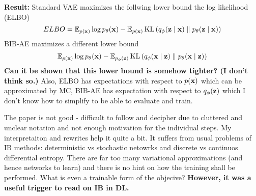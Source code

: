 \begin{notebox}
\textbf{Result: }
Standard VAE maximizes the follwing lower bound the log likelihood (ELBO)
\begin{equation}
ELBO = \mathbb{E}_{p(\mathbf{x})} \log p_\theta(\mathbf{x}) - \mathbb{E}_{p(\mathbf{x})} \operatorname*{KL} \left( q_\phi( \mathbf{z} \mid \mathbf{x}) \parallel p_\theta(\mathbf{z} \mid \mathbf{x}) \right)
\end{equation}
BIB-AE maximizes a different lower bound
\begin{equation}
\mathbb{E}_{p(\mathbf{x})} \log p_\theta(\mathbf{x}) - \mathbb{E}_{p_\phi(\mathbf{z})} \operatorname*{KL} \left( q_\phi(\mathbf{x} \mid \mathbf{z}) \parallel p_\theta(\mathbf{x} \mid \mathbf{z}) \right)
\end{equation}
\textbf{Can it be shown that this lower bound is somehow tighter? (I don't think so.)}
Also, ELBO has expectations with respect to $p(\mathbf{x})$ which can be approximated by MC, BIB-AE has expectation with respect to $q_\phi(\mathbf{z})$ which I don't know how to simplify to be able to evaluate and train.
\end{notebox}

\begin{notebox}
\concl The paper is not good - difficult to follow and decipher due to cluttered and unclear notation and not enough motivation for the individual steps.
My interpretaiton and rewrites help it quite a bit.
It suffers from usual problems of IB methods: deterministic vs stochastic netowrks and discrete vs continuos differential entropy.
There are far too many variational approximations (and hence networks to learn) and there is no hint on how the training shall be performed.
What is even a trainable form of the objecive?
\textbf{However, it was a useful trigger to read on IB in DL.}
\end{notebox}
